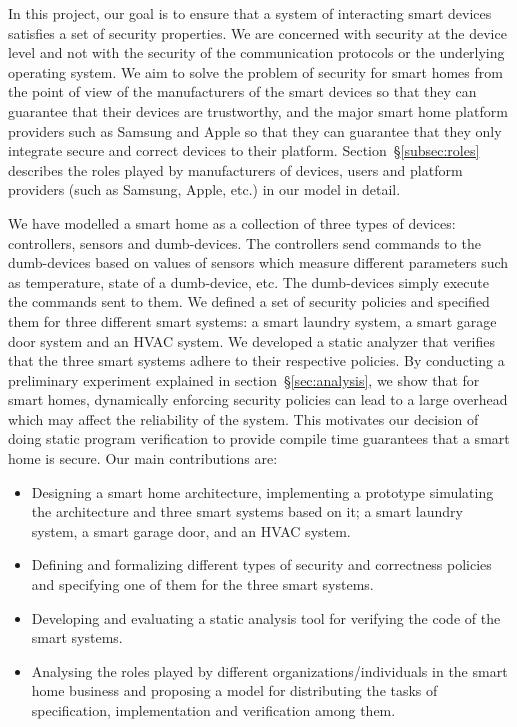 \documentclass{article}
\begin{document}
In this project, our goal is to ensure that a system of interacting smart devices satisfies a set of security properties. We are concerned with security at the device level and not with the security of the communication protocols or the underlying operating system. We aim to solve the problem of security for smart homes from the point of view of the manufacturers of the smart devices so that they can guarantee that their devices are trustworthy, and the major smart home platform providers such as Samsung and Apple so that they can guarantee that they only integrate secure and correct devices to their platform. Section~\S\ref{subsec:roles} describes the roles played by manufacturers of devices, users and platform providers (such as Samsung, Apple, etc.) in our model in detail.

We have modelled a smart home as a collection of three types of devices: controllers, sensors and dumb-devices. The controllers send commands to the dumb-devices based on values of sensors which measure different parameters such as temperature, state of a dumb-device, etc. The dumb-devices simply execute the commands sent to them.
We defined a set of security policies and specified them for three different smart systems: a smart laundry system, a smart garage door system and an HVAC system. We developed a static analyzer that verifies that the three smart systems adhere to their respective policies. By conducting a preliminary experiment explained in section~\S\ref{sec:analysis}, we show that for smart homes, dynamically enforcing security policies can lead to a large overhead which may affect the reliability of the system. This motivates our decision of doing static program verification to provide compile time guarantees that a smart home is secure. Our main contributions are:
\begin{itemize}[topsep=0pt,itemsep=0ex,partopsep=1ex,parsep=1ex]
    \item Designing a smart home architecture, implementing a prototype simulating the architecture and three smart systems based on it; a smart laundry system, a smart garage door, and an HVAC system.    
    \item Defining and formalizing different types of security and correctness policies and specifying one of them for the three smart systems.
    \item Developing and evaluating a static analysis tool for verifying the code of the smart systems.
    \item Analysing the roles played by different organizations/individuals in the smart home business and proposing a model for distributing the tasks of specification, implementation and verification among them.
\end{itemize}
  
\end{document}
